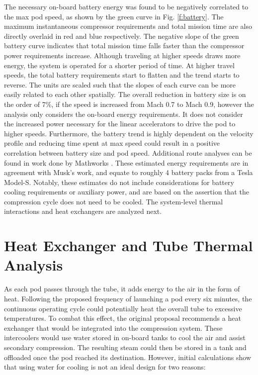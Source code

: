 \documentclass[heading.tex]{subfiles}
\begin{document}
The necessary on-board battery energy was found to be negatively correlated to the max pod speed,
as shown by the green curve in Fig. \ref{f:battery}.
The maximum instantaneous compressor requirements and total mission time
are also directly overlaid in red and blue respectively. 
The negative slope of the green battery curve indicates that total mission time falls
faster than the compressor power requirements increase.
Although traveling at higher speeds draws more energy, the system is operated for a shorter period of time.
At higher travel speeds, the total battery requirements start to flatten and the trend starts to reverse.
The units are scaled such that the slopes of each curve can be more easily related to each other spatially.
The overall reduction in battery size is on the order of 7\%, if the speed is increased from Mach 0.7 to Mach 0.9, 
however the analysis only considers the on-board energy requirements. It does not consider the increased power
necessary for the linear accelerators to drive the pod to higher speeds. 
Furthermore, the battery trend is highly dependent on the velocity profile
and reducing time spent at max speed could result in a positive correlation between battery size and pod speed.
Additional route analyses can be found in work done by Mathworks \cite{Rouleau}.
These estimated energy requirements are in agreement with Musk's work,
and equate to roughly 4 battery packs from a Tesla Model-S.
Notably, these estimates do not include considerations for battery cooling requirements or auxiliary power,
and are based on the assertion that the compression cycle does not need to be cooled.
The system-level thermal interactions and heat exchangers are analyzed next.

\section{Heat Exchanger and Tube Thermal Analysis}
\label{s:heatex}
As each pod passes through the tube, it adds energy to the air in the form of heat.
Following the proposed frequency of launching a pod every six minutes,
the continuous operating cycle could potentially heat the overall tube to excessive temperatures.
To combat this effect, the original proposal recommends a heat exchanger that would be integrated into the compression system.
These intercoolers would use water stored in on-board tanks to cool the air and assist secondary compression.
The resulting steam could then be stored in a tank and offloaded once the pod reached its destination.
However, initial calculations show that using water for cooling is not an ideal design for two reasons:
\end{document}
